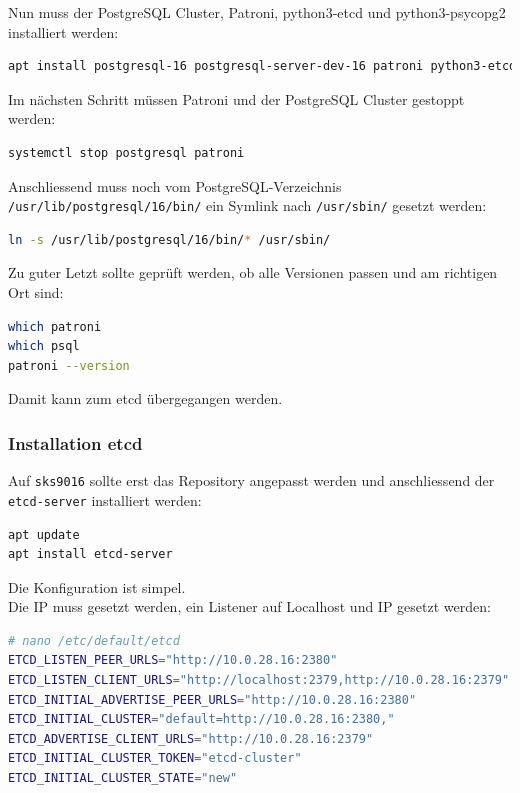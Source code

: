 Nun muss der \Gls{PostgreSQL Cluster}, Patroni, python3-etcd und python3-psycopg2 installiert werden:
\lstset{style=gra_codestyle}
\begin{lstlisting}[language=bash, caption=Patroni - Prerequisites installieren,captionpos=b,label={lst:patroni-prerequisites-install},breaklines=true]
apt install postgresql-16 postgresql-server-dev-16 patroni python3-etcd python3-psycopg2
\end{lstlisting}

Im nächsten Schritt müssen Patroni und der \Gls{PostgreSQL Cluster} gestoppt werden:
\lstset{style=gra_codestyle}
\begin{lstlisting}[language=bash, caption=Patroni - Stop Patroni und PostgreSQL,captionpos=b,label={lst:patroni-stop-postgresql-patroni},breaklines=true]
systemctl stop postgresql patroni
\end{lstlisting}

Anschliessend muss noch vom PostgreSQL-Verzeichnis \texttt{/usr/lib/postgresql/16/bin/} ein Symlink nach \texttt{/usr/sbin/} gesetzt werden:
\lstset{style=gra_codestyle}
\begin{lstlisting}[language=bash, caption=Patroni - Symlink binaries,captionpos=b,label={lst:patroni_symlink_bins},breaklines=true]
ln -s /usr/lib/postgresql/16/bin/* /usr/sbin/
\end{lstlisting}

Zu guter Letzt sollte geprüft werden, ob alle Versionen passen und am richtigen Ort sind:
\lstset{style=gra_codestyle}
\begin{lstlisting}[language=bash, caption=Patroni - Checks,captionpos=b,label={lst:patroni-checks},breaklines=true]
which patroni
which psql
patroni --version
\end{lstlisting}
Damit kann zum \gls{etcd} übergegangen werden.
\subsubsection{Installation etcd}
Auf \texttt{sks9016} sollte erst das Repository angepasst werden und anschliessend der \texttt{etcd-server} installiert werden:
\lstset{style=gra_codestyle}
\begin{lstlisting}[language=bash, caption=etcd - Installation,captionpos=b,label={lst:etcd_install},breaklines=true]
apt update
apt install etcd-server
\end{lstlisting}

Die Konfiguration ist simpel.\\
Die IP muss gesetzt werden, ein Listener auf Localhost und IP gesetzt werden:
\lstset{style=gra_codestyle}
\begin{lstlisting}[language=bash, caption=etcd - Konfiguration,captionpos=b,label={lst:etcd_configuration},breaklines=true]
# nano /etc/default/etcd
ETCD_LISTEN_PEER_URLS="http://10.0.28.16:2380"
ETCD_LISTEN_CLIENT_URLS="http://localhost:2379,http://10.0.28.16:2379"
ETCD_INITIAL_ADVERTISE_PEER_URLS="http://10.0.28.16:2380"
ETCD_INITIAL_CLUSTER="default=http://10.0.28.16:2380,"
ETCD_ADVERTISE_CLIENT_URLS="http://10.0.28.16:2379"
ETCD_INITIAL_CLUSTER_TOKEN="etcd-cluster"
ETCD_INITIAL_CLUSTER_STATE="new"
\end{lstlisting}

